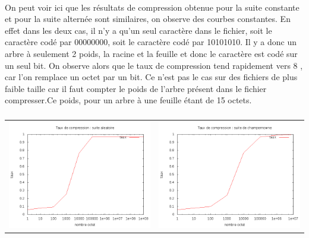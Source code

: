 \documentclass{report}
\begin{document}
\paragraph*{}
On peut voir ici que les  résultats de compression obtenue pour la suite constante et pour la suite alternée sont similaires, on observe des courbes constantes. En effet dans les deux cas, il n'y a qu'un seul caractère dans le fichier, soit le caractère codé par 00000000, soit le caractère codé par 10101010. Il y a donc un arbre à seulement 2 poids, la racine et la feuille et donc le caractère est codé sur un seul bit. On observe alors que le taux de compression tend rapidement vers 8 , car l'on remplace un octet par un bit. Ce n'est pas le cas sur des fichiers de plus faible taille car il faut compter le poids de l'arbre présent dans le fichier compresser.Ce poids, pour un arbre à une feuille étant de 15 octets.
\subparagraph*{}
\hspace{-2cm}\begin{tabular}{l | l}
\includegraphics[width=7cm]{aleaH.png} & 
\includegraphics[width=7cm]{champH.png}
\end{tabular}
\end{document}
